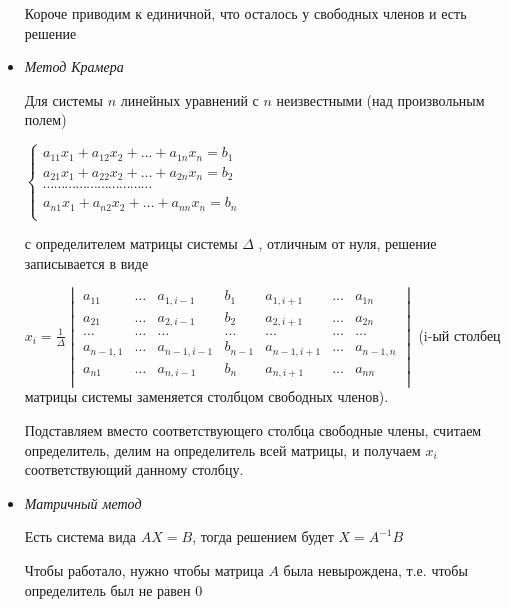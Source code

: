 \documentclass{article}
\begin{document}
\begin{itemize}
\begin{enumerate}
	\end{enumerate}

	Короче приводим к единичной, что осталось у свободных членов и есть решение
	
	\item {\it Метод Крамера}
	
	Для системы $n$ линейных уравнений с $n$ неизвестными (над произвольным полем)
	
	$\begin{cases}a_{11}x_{1}+a_{12}x_{2}+\ldots +a_{1n}x_{n}=b_{1}\\a_{21}x_{1}+a_{22}x_{2}+\ldots +a_{2n}x_{n}=b_{2}\\\cdots \cdots \cdots \cdots \cdots \cdots \cdots \cdots \cdots \cdots \\a_{n1}x_{1}+a_{n2}x_{2}+\ldots +a_{nn}x_{n}=b_{n}\\
	\end{cases}$
	
	с определителем матрицы системы $\Delta$ , отличным от нуля, решение записывается в виде
	
	$ x_{i}={\frac {1}{\Delta }}{\begin{vmatrix}a_{11}&\ldots &a_{1,i-1}&b_{1}&a_{1,i+1}&\ldots &a_{1n}\\a_{21}&\ldots &a_{2,i-1}&b_{2}&a_{2,i+1}&\ldots &a_{2n}\\\ldots &\ldots &\ldots &\ldots &\ldots &\ldots &\ldots \\a_{n-1,1}&\ldots &a_{n-1,i-1}&b_{n-1}&a_{n-1,i+1}&\ldots &a_{n-1,n}\\a_{n1}&\ldots &a_{n,i-1}&b_{n}&a_{n,i+1}&\ldots &a_{nn}\\\end{vmatrix}}$
	(i-ый столбец матрицы системы заменяется столбцом свободных членов).
	
	Подставляем вместо соответствующего столбца свободные члены, считаем определитель, делим на определитель всей матрицы, и получаем $x_i$ соответствующий данному столбцу.
	
	\item {\it Матричный метод}
	
	Есть система вида $AX=B$, тогда решением будет $X=A^{-1}B$
	
	Чтобы работало, нужно чтобы матрица $A$ была невырождена, т.е. чтобы определитель был не равен 0
	
\end{itemize}
\end{document}
